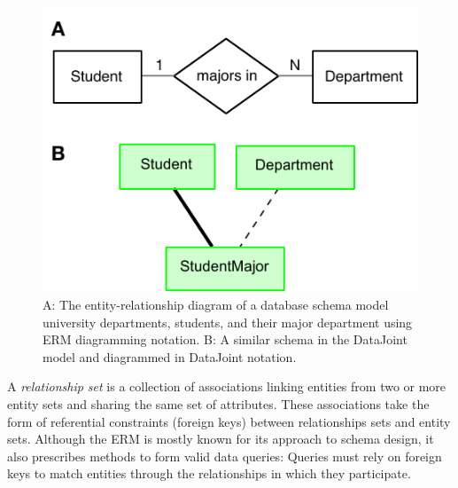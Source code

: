 \documentclass[letter,10pt]{article}
\newcommand{\datajoint}{DataJoint\xspace}
\begin{document}
\begin{figure}
\includegraphics{major-erd.pdf}
\caption{
{\sf A:} The entity-relationship diagram of a database schema model university departments, students,  and their major department using ERM diagramming notation.
{\sf B:} A similar schema in the \datajoint model and diagrammed in \datajoint notation.}
\label{fig:erm-notation}
\end{figure}


A \emph{relationship set} is a collection of associations linking entities from two or more entity sets and sharing the same set of attributes. 
These associations take the form of referential constraints (foreign keys) between relationships sets and entity sets.
Although the ERM is mostly known for its approach to schema design, it also prescribes methods to form valid data queries: Queries must rely on foreign keys to match entities through the relationships in which they participate. 
\end{document}
